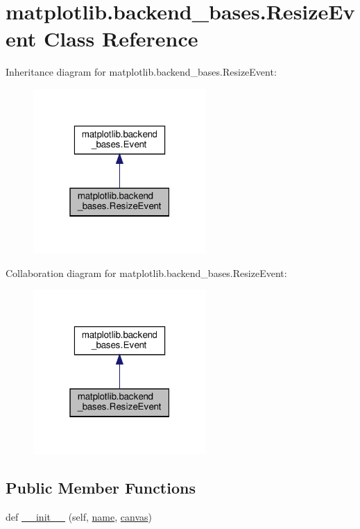 \hypertarget{classmatplotlib_1_1backend__bases_1_1ResizeEvent}{}\section{matplotlib.\+backend\+\_\+bases.\+Resize\+Event Class Reference}
\label{classmatplotlib_1_1backend__bases_1_1ResizeEvent}


Inheritance diagram for matplotlib.\+backend\+\_\+bases.\+Resize\+Event\+:
\nopagebreak
\begin{figure}[H]
\begin{center}
\leavevmode
\includegraphics[width=187pt]{classmatplotlib_1_1backend__bases_1_1ResizeEvent__inherit__graph}
\end{center}
\end{figure}


Collaboration diagram for matplotlib.\+backend\+\_\+bases.\+Resize\+Event\+:
\nopagebreak
\begin{figure}[H]
\begin{center}
\leavevmode
\includegraphics[width=187pt]{classmatplotlib_1_1backend__bases_1_1ResizeEvent__coll__graph}
\end{center}
\end{figure}
\subsection*{Public Member Functions}
\begin{DoxyCompactItemize}
\item 
def \hyperlink{classmatplotlib_1_1backend__bases_1_1ResizeEvent_af4b8bd88cf5073bda283f728c7c60725}{\+\_\+\+\_\+init\+\_\+\+\_\+} (self, \hyperlink{classmatplotlib_1_1backend__bases_1_1Event_a4b10ea7af7c8a0b20bcdbb9ca03e1654}{name}, \hyperlink{classmatplotlib_1_1backend__bases_1_1Event_a7721d867d81a1255b1aeb51babec4e14}{canvas})
\end{DoxyCompactItemize}
